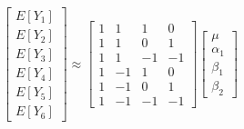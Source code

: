 \documentclass[]{article}
\begin{document}
\[\begin{bmatrix}
E[Y_1]\\E[Y_2]\\E[Y_3]\\E[Y_4]\\E[Y_5]\\E[Y_6]
\end{bmatrix} \approx \begin{bmatrix}
1 & 1 & 1 & 0 \\
1 & 1 & 0 & 1 \\ 
1 & 1 & -1 & -1\\
1 & -1 & 1 & 0 \\
1 & -1 & 0 & 1 \\
1 & -1 & -1 & -1
\end{bmatrix}\begin{bmatrix}
\mu\\
\alpha_1\\
\beta_1\\
\beta_2
\end{bmatrix}
\]
\end{document}
